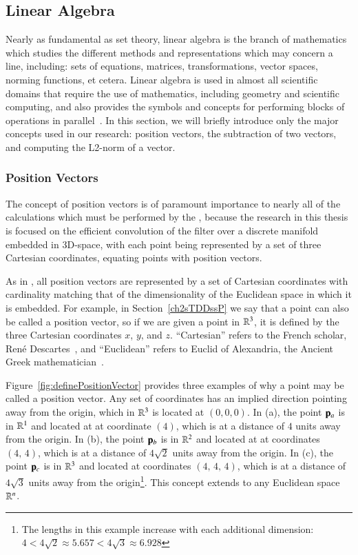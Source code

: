 \subsection{Linear Algebra}
\label{ch2sETBssLA}
Nearly as fundamental as set theory, linear algebra is the branch of mathematics which studies the different methods and representations which may concern a line, including: sets of equations, matrices, transformations, vector spaces, norming functions, et cetera. Linear algebra is used in almost all scientific domains that require the use of mathematics, including geometry and scientific computing, and also provides the symbols and concepts for performing blocks of operations in parallel~\cite{Weisstein19i}. In this section, we will briefly introduce only the major concepts used in our research: position vectors, the subtraction of two vectors, and computing the L2-norm of a vector.

%
%
\subsubsection{Position Vectors}
\label{ch2sETBssLAsssPV}
The concept of position vectors is of paramount importance to nearly all of the calculations which must be performed by the , because the research in this thesis is focused on the efficient convolution of the filter over a discrete manifold embedded in 3D-space, with each point being represented by a set of three Cartesian coordinates, equating points with position vectors.

As in \tdd{}, all position vectors are represented by a set of Cartesian coordinates with cardinality matching that of the dimensionality of the Euclidean space in which it is embedded. For example, in Section~\ref{ch2sTDDssP} we say that a point can also be called a position vector, so if we are given a point in $\mathbb{R}^{3}$, it is defined by the three Cartesian coordinates $x$, $y$, and $z$. ``Cartesian'' refers to the French scholar, René Descartes~\cite{EB1}, and ``Euclidean'' refers to Euclid of Alexandria, the Ancient Greek mathematician~\cite{EB2}.

Figure~\ref{fig:definePositionVector} provides three examples of why a point may be called a position vector. Any set of coordinates has an implied direction pointing away from the origin, which in $\mathbb{R}^{3}$ is located at $(0, 0, 0)$. In (a), the point $\mathbf{p}_a$ is in $\mathbb{R}^{1}$ and located at at coordinate $(4)$, which is at a distance of $4$ units away from the origin. In (b), the point $\mathbf{p}_b$ is in $\mathbb{R}^{2}$ and located at at coordinates $(4,\,4)$, which is at a distance of $4\sqrt{2}$ units away from the origin. In (c), the point $\mathbf{p}_c$ is in $\mathbb{R}^{3}$ and located at coordinates $(4,\,4,\,4)$, which is at a distance of $4\sqrt{3}$ units away from the origin\footnote{The lengths in this example increase with each additional dimension: $4 < 4\sqrt{2} \approx 5.657 < 4\sqrt{3} \approx 6.928$}. This concept extends to any Euclidean space $\mathbb{R}^{n}$.

